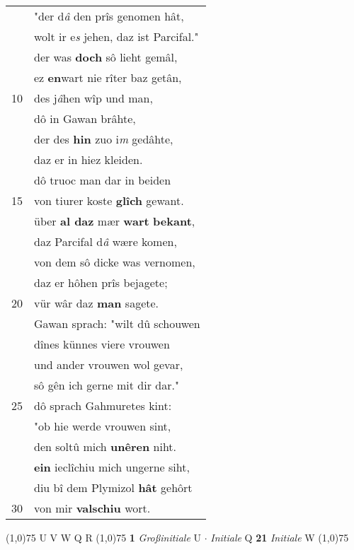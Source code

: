 \documentclass[8pt,a4paper,notitlepage]{article}
\begin{document}
\begin{table}[ht]
\begin{minipage}[t]{0.5\linewidth}
\begin{tabular}{rl}
 & "der d\textit{â} den prîs genomen hât,\\ 
 & wolt ir e\textit{s} jehen, daz ist Parcifal."\\ 
 & der was \textbf{doch} sô lieht gemâl,\\ 
 & ez \textbf{en}wart nie rîter baz getân,\\ 
10 & des j\textit{â}hen wîp und man,\\ 
 & dô in Gawan brâhte,\\ 
 & der des \textbf{hin} zuo i\textit{m} gedâhte,\\ 
 & daz er in hiez kleiden.\\ 
 & dô truoc man dar in beiden\\ 
15 & von tiurer koste \textbf{glîch} gewant.\\ 
 & über \textbf{al daz} mær \textbf{wart} \textbf{bekant},\\ 
 & daz Parcifal d\textit{â} wære komen,\\ 
 & von dem sô dicke was vernomen,\\ 
 & daz er hôhen prîs bejagete;\\ 
20 & vür wâr daz \textbf{man} sagete.\\ 
 & Gawan sprach: "wilt dû schouwen\\ 
 & dînes künnes viere vrouwen\\ 
 & und ander vrouwen wol gevar,\\ 
 & sô gên ich gerne mit dir dar."\\ 
25 & dô sprach Gahmuretes kint:\\ 
 & "ob hie werde vrouwen sint,\\ 
 & den soltû mich \textbf{unêren} niht.\\ 
 & \textbf{ein} ieclîchiu mich ungerne siht,\\ 
 & diu bî dem Plymizol \textbf{hât} gehôrt\\ 
30 & von mir \textbf{valschiu} wort.\\ 
\end{tabular}
\scriptsize
\line(1,0){75} \newline
U V W Q R \newline
\line(1,0){75} \newline
\textbf{1} \textit{Großinitiale} U   $\cdot$ \textit{Initiale} Q  \textbf{21} \textit{Initiale} W  \newline
\line(1,0){75} \newline

\end{minipage}
\end{table}
\end{document}
